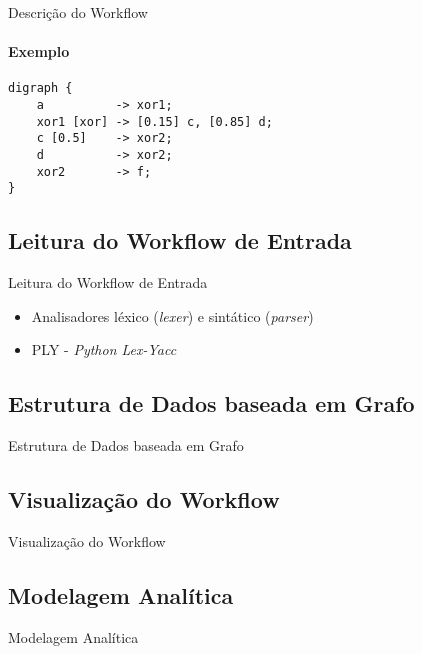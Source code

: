 \documentclass[xcolor=x11names,compress]{beamer}
\renewcommand{\(}{\begin{columns}}
\renewcommand{\)}{\end{columns}}
\newcommand{\<}[1]{\begin{column}{#1}}
\renewcommand{\>}{\end{column}}
\begin{document}
\begin{frame}[fragile]{Descrição do Workflow}
    \framesubtitle{Exemplo}
    \begin{lstlisting}
digraph {
    a          -> xor1;
    xor1 [xor] -> [0.15] c, [0.85] d;
    c [0.5]    -> xor2;
    d          -> xor2;
    xor2       -> f;
}
    \end{lstlisting}
\end{frame}

    \subsection{Leitura do Workflow de Entrada}
        \begin{frame}{Leitura do Workflow de Entrada}
            \begin{itemize}
                \item Analisadores léxico (\emph{lexer}) e sintático (\emph{parser})
                \item PLY - \emph{Python Lex-Yacc}
            \end{itemize}
        \end{frame}

    \subsection{Estrutura de Dados baseada em Grafo}
        \begin{frame}{Estrutura de Dados baseada em Grafo}

        \end{frame}

    \subsection{Visualização do Workflow}
        \begin{frame}{Visualização do Workflow}

        \end{frame}

    \subsection{Modelagem Analítica}
        \begin{frame}{Modelagem Analítica}

        \end{frame}
\end{document}
